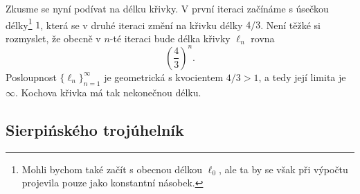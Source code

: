 Zkusme se nyní podívat na délku křivky. V první iteraci začínáme s úsečkou délky\footnote{Mohli bychom také začít s obecnou délkou $\ell_0$, ale ta by se však při výpočtu projevila pouze jako konstantní násobek.} $1$, která se v druhé iteraci změní na křivku délky $4/3$. Není těžké si rozmyslet, že obecně v $n$-té iteraci bude délka křivky $\ell_n$ rovna
\begin{equation*}
    \left(\dfrac{4}{3}\right)^{n}.
\end{equation*}
Posloupnost $\{\ell_n\}_{n=1}^{\infty}$ je geometrická s kvocientem $4/3>1$, a tedy její limita je $\infty$. Kochova křivka má tak nekonečnou délku.

\subsection{Sierpińského trojúhelník}\label{subsec:sierpinskeho_trojuhelnik}


